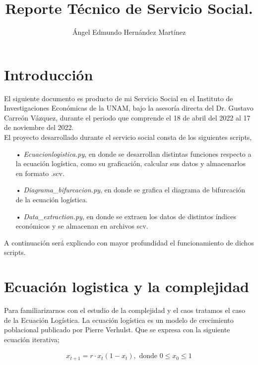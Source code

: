 \documentclass[10pt,a4paper]{article}
\author{Ángel Edmundo Hernández Martínez}
\title{Reporte Técnico de Servicio Social.}
\date{}
\begin{document}
\maketitle

\section{Introducción}

	El siguiente documento es producto de mi Servicio Social en el Instituto de Investigaciones Económicas de la UNAM, bajo la asesoría directa del Dr. Gustavo Carreón Vázquez, durante el periodo que comprende el 18 de abril del 2022 al 17 de noviembre del 2022. \\
	
	El proyecto desarrollado durante el servicio social consta de los siguientes scripts, 
	
\begin{itemize}
	
	\item[•] \textit{Ecuacionlogistica.py}, en donde se desarrollan distintas funciones respecto a la ecuación logística, como su graficación, calcular sus datos y almacenarlos en formato .scv.
	
	\item[•] \textit{Diagrama{\_}bifurcacion.py}, en donde se grafica el diagrama de bifurcación de la ecuación logística.
	
	\item[•] \textit{Data{\_}extraction.py}, en donde se extraen los datos de distintos índices económicos y se almacenan en archivos scv.
	
\end{itemize}

	A continuación será explicado con mayor profundidad el funcionamiento de dichos scripts.
	
\section{Ecuación logistica y la complejidad}

	Para familiarizarnos con el estudio de la complejidad y el caos tratamos el caso de la Ecuación Logística. 
	La ecuación logística es un modelo de crecimiento poblacional publicado por Pierre Verhulst. Que se expresa con la siguiente ecuación iterativa;
	
	\begin{align*}
	x_{t+1} =  r\cdot x_{t}(1 - x_t), \text{ donde } 0 \leq x_0 \leq 1 
	\end{align*}
	
\end{document}
